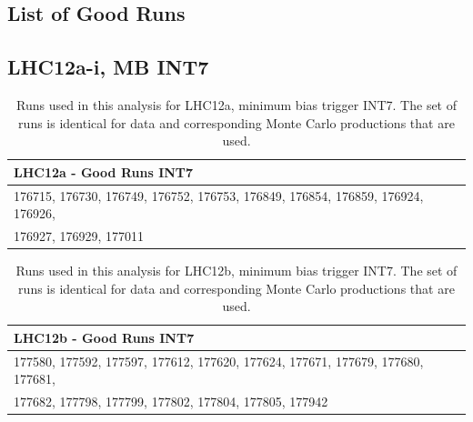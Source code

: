 \documentclass[ALICE]{ALICE_analysis_notes}
\begin{document}
\begin{appendix}
\section{List of Good Runs}
\label{sec:goodRuns}
\subsection{LHC12a-i, MB INT7}
\label{subsec:goodRuns12}

\begin{table}[h!]
	\hspace*{-0.2cm}
	\small
	\centering
	\begin{tabular}{ll}  
	    \toprule
	    \textbf{LHC12a - Good Runs INT7} \\ \midrule
		176715, 176730, 176749, 176752, 176753, 176849, 176854, 176859, 176924, 176926, \\ \midrule
		176927, 176929, 177011 \\
		\bottomrule
	\end{tabular}
	\caption{Runs used in this analysis for LHC12a, minimum bias trigger INT7. The set of runs is identical for data and corresponding Monte Carlo productions that are used.}
	\label{tab:runs12a}
\end{table}
	
\begin{table}[h!]
	\hspace*{-0.2cm}
	\small
	\centering
	\begin{tabular}{ll}  
	    \toprule
	    \textbf{LHC12b - Good Runs INT7} \\ \midrule
		177580, 177592, 177597, 177612, 177620, 177624, 177671, 177679, 177680, 177681, \\ \midrule
		177682, 177798, 177799, 177802, 177804, 177805, 177942 \\
		\bottomrule
	\end{tabular}
	\caption{Runs used in this analysis for LHC12b, minimum bias trigger INT7. The set of runs is identical for data and corresponding Monte Carlo productions that are used.}
	\label{tab:runs12b}
\end{table}
	

\end{appendix}
\end{document}
